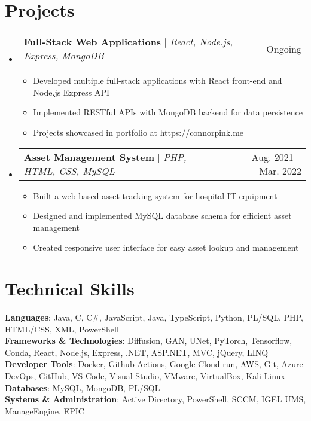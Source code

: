 \documentclass[letterpaper,11pt]{article}
\makeatletter
\newcommand{\resumeItem}[1]{
  \item\small{
    {#1 \vspace{-2pt}}
  }
}
\newcommand{\resumeProjectHeading}[2]{
    \item
    \begin{tabular*}{0.97\textwidth}{l@{\extracolsep{\fill}}r}
      \small#1 & #2 \\
    \end{tabular*}\vspace{-7pt}
}
\newcommand{\resumeSubHeadingListStart}{\begin{itemize}[leftmargin=0.15in, label={}]}
\newcommand{\resumeSubHeadingListEnd}{\end{itemize}}
\newcommand{\resumeItemListStart}{\begin{itemize}}
\newcommand{\resumeItemListEnd}{\end{itemize}\vspace{-5pt}}
\makeatother
\begin{document}
\section{Projects}
    \resumeSubHeadingListStart
      \resumeProjectHeading
          {\textbf{Full-Stack Web Applications} $|$ \emph{React, Node.js, Express, MongoDB}}{Ongoing}
          \resumeItemListStart
            \resumeItem{Developed multiple full-stack applications with React front-end and Node.js Express API}
            \resumeItem{Implemented RESTful APIs with MongoDB backend for data persistence}
            \resumeItem{Projects showcased in portfolio at https://connorpink.me}
          \resumeItemListEnd
      \resumeProjectHeading
          {\textbf{Asset Management System} $|$ \emph{PHP, HTML, CSS, MySQL}}{Aug. 2021 -- Mar. 2022}
          \resumeItemListStart
            \resumeItem{Built a web-based asset tracking system for hospital IT equipment}
            \resumeItem{Designed and implemented MySQL database schema for efficient asset management}
            \resumeItem{Created responsive user interface for easy asset lookup and management}
          \resumeItemListEnd
    \resumeSubHeadingListEnd


\section{Technical Skills}
 \begin{itemize}[leftmargin=0.15in, label={}]
    \small{\item{
     \textbf{Languages}{: Java, C, C\#, JavaScript, Java, TypeScript, Python, PL/SQL, PHP, HTML/CSS, XML, PowerShell} \\
     \textbf{Frameworks \& Technologies}{: Diffusion, GAN, UNet, PyTorch, Tensorflow, Conda, React, Node.js, Express, .NET, ASP.NET, MVC, jQuery, LINQ} \\
     \textbf{Developer Tools}{: Docker, Github Actions, Google Cloud run, AWS, Git, Azure DevOps, GitHub, VS Code, Visual Studio, VMware, VirtualBox, Kali Linux} \\
     \textbf{Databases}{: MySQL, MongoDB, PL/SQL} \\
     \textbf{Systems \& Administration}{: Active Directory, PowerShell, SCCM, IGEL UMS, ManageEngine, EPIC}
    }}
 \end{itemize}


\end{document}
